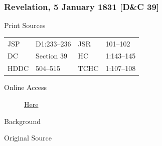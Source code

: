 		\subsubsection{Revelation, 5 January 1831 [D\&C 39]}
			\label{EMS-1831-JS-5-JAN-1831}
		
			\begin{description}
				\item[Print Sources]
			\end{description}

				\begin{tabular}{p{0.5in}p{1in}p{0.5in}p{1in}}
				JSP	 	& D1:233--236	& JSR 		& 101--102 \\
				DC	 	& Section 39 	& HC 		& 1:143--145 \\
				HDDC 	& 504--515		& TCHC 		& 1:107--108 \\
				\end{tabular}
			
			\begin{description}
				\item[Online Access] \href{https://www.josephsmithpapers.org/paper-summary/revelation-5-january-1831-dc-39/1}{Here}
			\end{description}
			
			\begin{description}
				\item[Background]
			\end{description}
			
			
			\begin{description}
				\item[Original Source]
			\end{description}
			
			

